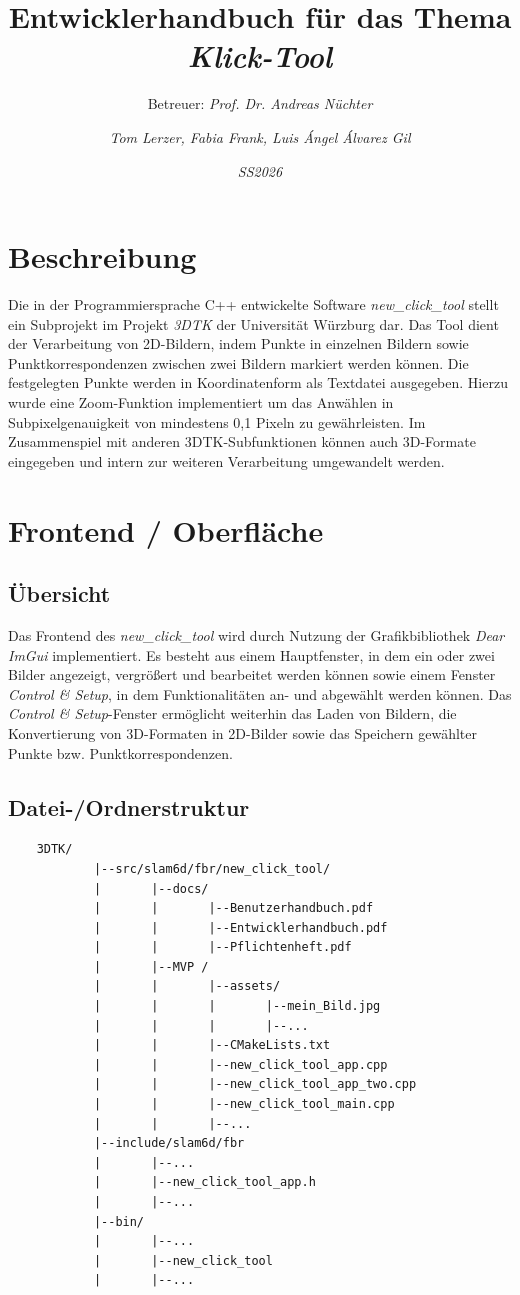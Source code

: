 \documentclass[a4paper,10pt]{scrartcl}
\title{Entwicklerhandbuch für das Thema \glqq\textit{Klick-Tool}\grqq}
\subtitle{Betreuer: \textit{Prof. Dr. Andreas Nüchter}}
\author{\textit{Tom Lerzer, Fabia Frank, Luis Ángel Álvarez Gil}}
\date{\textit{SS2026}}
\begin{document}
\maketitle

\tableofcontents

\newpage

\section{Beschreibung}

Die in der Programmiersprache C++ entwickelte Software \textit{new\_click\_tool} stellt ein Subprojekt im Projekt \textit{3DTK} der Universität Würzburg dar. Das Tool dient der Verarbeitung von 2D-Bildern, indem Punkte in einzelnen Bildern sowie Punktkorrespondenzen zwischen zwei Bildern markiert werden können. Die festgelegten Punkte werden in Koordinatenform als Textdatei ausgegeben. Hierzu wurde eine Zoom-Funktion implementiert um das Anwählen in Subpixelgenauigkeit von mindestens 0,1 Pixeln zu gewährleisten. Im Zusammenspiel mit anderen 3DTK-Subfunktionen können auch 3D-Formate eingegeben und intern zur weiteren Verarbeitung umgewandelt werden. 

\newpage

\section{Frontend / Oberfläche}

\subsection{Übersicht}

Das Frontend des \textit{new\_click\_tool} wird durch Nutzung der Grafikbibliothek \textit{Dear ImGui} implementiert. Es besteht aus einem Hauptfenster, in dem ein oder zwei Bilder angezeigt, vergrößert und bearbeitet werden können sowie einem Fenster \textit{Control \& Setup}, in dem Funktionalitäten an- und abgewählt werden können. Das \textit{Control \& Setup}-Fenster ermöglicht weiterhin das Laden von Bildern, die Konvertierung von 3D-Formaten in 2D-Bilder sowie das Speichern gewählter Punkte bzw. Punktkorrespondenzen.


\subsection{Datei-/Ordnerstruktur}
\begin{verbatim}
	3DTK/
			|--src/slam6d/fbr/new_click_tool/
			|		|--docs/
			|		|		|--Benutzerhandbuch.pdf
			|		|		|--Entwicklerhandbuch.pdf
			|		|		|--Pflichtenheft.pdf
			|		|--MVP /
			|		|		|--assets/
			|		|		|		|--mein_Bild.jpg
			|		|		|		|--...
			|		|		|--CMakeLists.txt
			|		|		|--new_click_tool_app.cpp
			|		|		|--new_click_tool_app_two.cpp
			|		|		|--new_click_tool_main.cpp
			|		|		|--...
			|--include/slam6d/fbr
			|		|--...
			|		|--new_click_tool_app.h
			|		|--...
			|--bin/
			|		|--...
			|		|--new_click_tool
			|		|--...
			
\end{verbatim}
\end{document}
